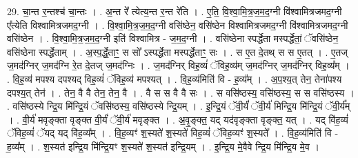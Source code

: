 \documentclass[17pt]{extarticle}
\begin{document}
29. चा॒न्त र॒न्तश्च॑ चा॒न्तः । . अ॒न्त रे᳚ त्येत्य॒न्त र॒न्त रे॑ति । . ए॒ति॒ वि॒श्वा॒मि॒त्र॒ज॒म॒द॒ग्नी वि॑श्वामित्रजमद॒ग्नी ए᳚त्येति विश्वामित्रजमद॒ग्नी । . वि॒श्वा॒मि॒त्र॒ज॒म॒द॒ग्नी वसि॑ष्ठेन॒ वसि॑ष्ठेन विश्वामित्रजमद॒ग्नी वि॑श्वामित्रजमद॒ग्नी वसि॑ष्ठेन । . वि॒श्वा॒मि॒त्र॒ज॒म॒द॒ग्नी इति॑ विश्वामित्र - ज॒म॒द॒ग्नी । . वसि॑ष्ठेना स्पर्द्धेता मस्पर्द्धेतां॒ ॅवसि॑ष्ठेन॒ वसि॑ष्ठेना स्पर्द्धेताम् । . अ॒स्प॒र्द्धे॒ताꣳ॒॒ स सो᳚ ऽस्पर्द्धेता मस्पर्द्धेताꣳ॒॒ सः । . स ए॒त दे॒तथ् स स ए॒तत् । . ए॒तज् ज॒मद॑ग्निर् ज॒मद॑ग्नि रे॒त दे॒तज् ज॒मद॑ग्निः । . ज॒मद॑ग्निर् विह॒व्यं॑ ॅविह॒व्य॑म् ज॒मद॑ग्निर् ज॒मद॑ग्निर् विह॒व्य᳚म् । . वि॒ह॒व्य॑ मपश्य दपश्यद् विह॒व्यं॑ ॅविह॒व्य॑ मपश्यत् । . वि॒ह॒व्य॑मिति॑ वि - ह॒व्य᳚म् । . अ॒प॒श्य॒त् तेन॒ तेना॑पश्य दपश्य॒त् तेन॑ । . तेन॒ वै वै तेन॒ तेन॒ वै । . वै स स वै वै सः । . स वसि॑ष्ठस्य॒ वसि॑ष्ठस्य॒ स स वसि॑ष्ठस्य । . वसि॑ष्ठस्ये न्द्रि॒य मि॑न्द्रि॒यं ॅवसि॑ष्ठस्य॒ वसि॑ष्ठस्ये न्द्रि॒यम् । . इ॒न्द्रि॒यं ॅवी॒र्यं॑ ॅवी॒र्य॑ मिन्द्रि॒य मि॑न्द्रि॒यं ॅवी॒र्य᳚म् । . वी॒र्य॑ मवृङ्क्ता वृङ्क्त वी॒र्यं॑ ॅवी॒र्य॑ मवृङ्क्त । . अ॒वृ॒ङ्क्त॒ यद् यद॑वृङ्क्ता वृङ्क्त॒ यत् । . यद् वि॑ह॒व्यं॑ ॅविह॒व्यं॑ ॅयद् यद् वि॑ह॒व्य᳚म् । . वि॒ह॒व्यꣳ॑ श॒स्यते॑ श॒स्यते॑ विह॒व्यं॑ ॅविह॒व्यꣳ॑ श॒स्यते᳚ । . वि॒ह॒व्य॑मिति॑ वि - ह॒व्य᳚म् । . श॒स्यत॑ इन्द्रि॒य मि॑न्द्रि॒यꣳ श॒स्यते॑ श॒स्यत॑ इन्द्रि॒यम् । . इ॒न्द्रि॒य मे॒वैवे न्द्रि॒य मि॑न्द्रि॒य मे॒व । \newline
\end{document}
